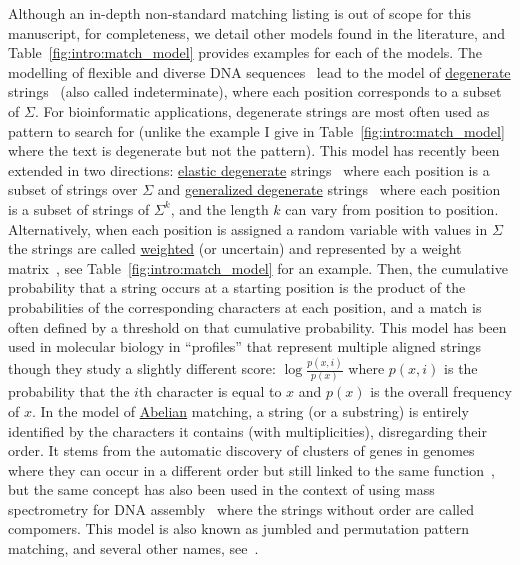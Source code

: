 Although an in-depth non-standard matching listing is out of scope for this manuscript, for completeness, we detail other models found in the literature, and Table~\ref{fig:intro:match_model} provides examples for each of the models.
The modelling of flexible and diverse DNA sequences~\cite{comm1970iupac} lead to the model of \underline{degenerate} strings~\cite{abrahamson1987generalized} (also called indeterminate), where each position corresponds to a subset of $\Sigma$. For bioinformatic applications, degenerate strings are most often used as pattern to search for (unlike the example I give in Table~\ref{fig:intro:match_model} where the text is degenerate but not the pattern).
This model has recently been extended in two directions: \underline{elastic degenerate} strings~\cite{iliopoulos2021efficient} where each position is a subset of strings over $\Sigma$ and \underline{generalized degenerate} strings~\cite{alzamel_et_al:LIPIcs:2018:9323} where each position is a subset of strings of $\Sigma^k$, and the length $k$ can vary from position to position.
Alternatively, when each position is assigned a random variable with values in $\Sigma$ the strings are called \underline{weighted} (or uncertain) and represented by a weight matrix~\cite{thompson1994clustal}, see Table~\ref{fig:intro:match_model} for an example. Then, the cumulative probability that a string occurs at a starting position is the product of the probabilities of the corresponding characters at each position, and a match is often defined by a threshold on that cumulative probability. This model has been used in molecular biology in ``profiles'' that represent multiple aligned strings~\cite{doi:10.1073/pnas.84.13.4355} though they study a slightly different score: $\log \frac{p(x,i)}{p(x)}$ where $p(x,i)$ is the probability that the $i$th character is equal to $x$ and $p(x)$ is the overall frequency of $x$. 
In the model of \underline{Abelian} matching, a string (or a substring) is entirely identified by the characters it contains (with multiplicities), disregarding their order. It stems from the automatic discovery of clusters of genes in genomes where they can occur in a different order but still linked to the same function~\cite{eres2004permutation}, but the same concept has also been used in the context  of using mass spectrometry for DNA assembly~\cite{bocker2003sequencing} where the strings without order are called compomers. This model is also known as jumbled and permutation pattern matching, and several other names, see~\cite{ejaz2010abelian}.
